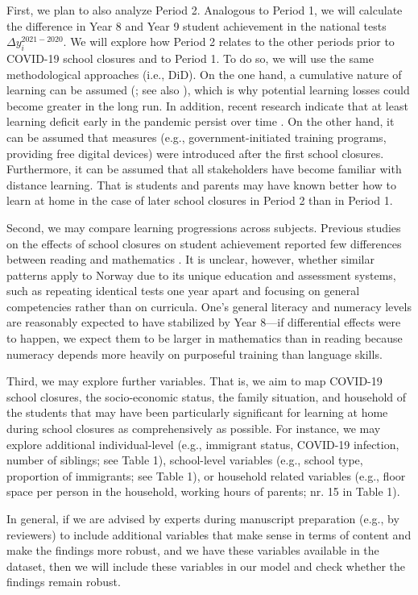 First, we plan to also analyze Period 2. Analogous to Period 1, we will calculate the difference in Year 8 and Year 9 student achievement in the national tests $\Delta y_i^{2021-2020}$. We will explore how Period 2 relates to the other periods prior to COVID-19 school closures and to Period 1. To do so, we will use the same methodological approaches (i.e., DiD). On the one hand, a cumulative nature of learning can be assumed (; see also ), which is why potential learning losses could become greater in the long run. In addition, recent research indicate that at least learning deficit early in the pandemic persist over time \parencite{betthauser:2022}. On the other hand, it can be assumed that measures (e.g., government-initiated training programs, providing free digital devices) were introduced after the first school closures. Furthermore, it can be assumed that all stakeholders have become familiar with distance learning. That is students and parents may have known better how to learn at home in the case of later school closures in Period 2 than in Period 1.

Second, we may compare learning progressions across subjects. Previous studies on the effects of school closures on student achievement reported few differences between reading and mathematics \parencite{hammerstein:2021}. It is unclear, however, whether similar patterns apply to Norway due to its unique education and assessment systems, such as repeating identical tests one year apart and focusing on general competencies rather than on curricula. One's general literacy and numeracy levels are reasonably expected to have stabilized by Year 8—if differential effects were to happen, we expect them to be larger in mathematics than in reading because numeracy depends more heavily on purposeful training than language skills.

Third, we may explore further variables. That is, we aim to map COVID-19 school closures, the socio-economic status, the family situation, and household of the students that may have been particularly significant for learning at home during school closures as comprehensively as possible. For instance, we may explore additional individual-level (e.g., immigrant status, COVID-19 infection, number of siblings; see Table 1), school-level variables (e.g., school type, proportion of immigrants; see Table 1), or household related variables (e.g., floor space per person in the household, working hours of parents; nr. 15 in Table 1).

In general, if we are advised by experts during manuscript preparation (e.g., by reviewers) to include additional variables that make sense in terms of content and make the findings more robust, and we have these variables available in the dataset, then we will include these variables in our model and check whether the findings remain robust.

